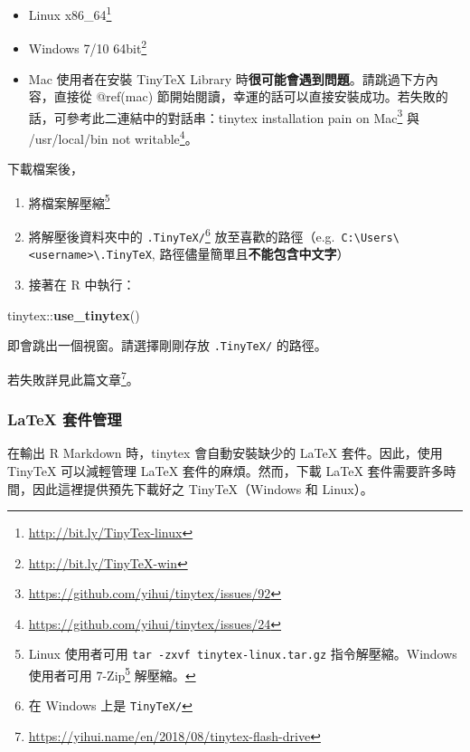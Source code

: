 \documentclass[]{book}
\newenvironment{Shaded}{}{}
\newcommand{\KeywordTok}[1]{\textcolor[rgb]{0.00,0.44,0.13}{\textbf{#1}}}
\newcommand{\NormalTok}[1]{#1}
\newcommand{\OperatorTok}[1]{\textcolor[rgb]{0.40,0.40,0.40}{#1}}
\renewcommand{\href}[2]{#2\footnote{\url{#1}}}
\providecommand{\tightlist}{%
  \setlength{\itemsep}{0pt}\setlength{\parskip}{0pt}}
\begin{document}
\begin{itemize}
\tightlist
\item
  \href{http://bit.ly/TinyTex-linux}{Linux x86\_64}
\item
  \href{http://bit.ly/TinyTeX-win}{Windows 7/10 64bit}
\item
  Mac 使用者在安裝 TinyTeX Library
  時\textbf{很可能會遇到問題}。請跳過下方內容，直接從 @ref(mac)
  節開始閱讀，幸運的話可以直接安裝成功。若失敗的話，可參考此二連結中的對話串：\href{https://github.com/yihui/tinytex/issues/92}{tinytex
  installation pain on Mac} 與
  \href{https://github.com/yihui/tinytex/issues/24}{/usr/local/bin not
  writable}。
\end{itemize}

下載檔案後，

\begin{enumerate}
\def\labelenumi{\alph{enumi})}
\item
  將檔案解壓縮\footnote{Linux 使用者可用
    \texttt{tar\ -zxvf\ tinytex-linux.tar.gz} 指令解壓縮。Windows
    使用者可用 \href{https://www.developershome.com/7-zip/}{7-Zip}
    解壓縮。}
\item
  將解壓後資料夾中的 \texttt{.TinyTeX/}\footnote{在 Windows 上是
    \texttt{TinyTeX/}}
  放至喜歡的路徑（e.g.~\texttt{C:\textbackslash{}Users\textbackslash{}\textless{}username\textgreater{}\textbackslash{}.TinyTeX},
  路徑儘量簡單且\textbf{不能包含中文字}）
\item
  接著在 R 中執行：
\end{enumerate}

\begin{Shaded}
\begin{Highlighting}[]
\NormalTok{tinytex}\OperatorTok{::}\KeywordTok{use\_tinytex}\NormalTok{()}
\end{Highlighting}
\end{Shaded}

即會跳出一個視窗。請選擇剛剛存放 \texttt{.TinyTeX/} 的路徑。

若失敗詳見\href{https://yihui.name/en/2018/08/tinytex-flash-drive}{此篇文章}。

\hypertarget{sec:tinytex-manage}{%
\subsubsection{LaTeX 套件管理}\label{sec:tinytex-manage}}

在輸出 R Markdown 時，tinytex 會自動安裝缺少的 LaTeX 套件。因此，使用
TinyTeX 可以減輕管理 LaTeX 套件的麻煩。然而，下載 LaTeX
套件需要許多時間，因此這裡提供預先下載好之 TinyTeX（Windows 和 Linux）。
\end{document}
